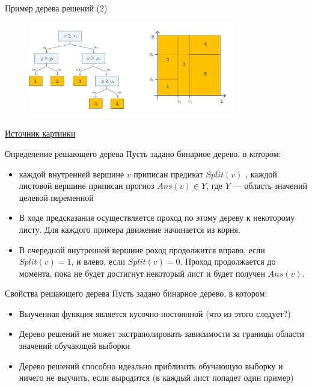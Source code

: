 \documentclass{beamer}
\begin{document}
\begin{frame}{Пример дерева решений (2)}
    \small
    \begin{figure}[H]
        \includegraphics[width=0.8\textwidth]{images/tree_2.png}
    \end{figure}
    \href{https://academy.yandex.ru/handbook/ml/article/reshayushchiye-derevya}{Источник картинки }
\end{frame}


\begin{frame}{Определение решающего дерева}
    \small
    Пусть задано бинарное дерево, в котором:
    \begin{itemize}
         \item каждой внутренней вершине $v$ приписан предикат $Split(v)$ , каждой листовой вершине  приписан прогноз $Ans(v) \in{Y} $, где $Y$ — область значений целевой переменной
        \item В ходе предсказания осуществляется проход по этому дереву к некоторому листу. Для каждого примера движение начинается из корня. 
        \item В очередной внутренней вершине роход продолжится вправо, если $Split(v)=1$, и влево, если $Split(v)=0$. Проход продолжается до момента, пока не будет достигнут некоторый лист и будет получен $Ans(v)$.
    \end{itemize}
    
\end{frame}

\begin{frame}{Свойства решающего дерева}
    \small
    Пусть задано бинарное дерево, в котором:
    \begin{itemize}
         \item Выученная функция является кусочно-постоянной (что из этого следует?)
        \item Дерево решений не может экстраполировать зависимости за границы области значений обучающей выборки
        \item Дерево решений способно идеально приблизить обучающую выборку и ничего не выучить, если выродится (в каждый лист попадет один пример)
    \end{itemize}
    
\end{frame}
\end{document}

